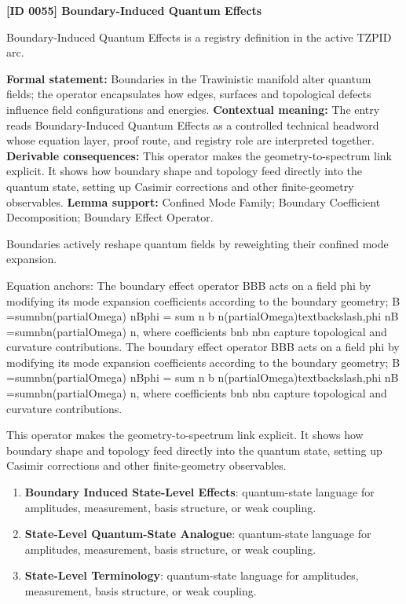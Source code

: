 \clearpage
\noindent\textbf{[ID 0055] Boundary-Induced Quantum Effects}\par
\vspace{0.35em}
\begingroup\small
{}
Boundary-Induced Quantum Effects is a registry definition in the active TZPID arc.

\begingroup\footnotesize\setlength{\emergencystretch}{3em}\sloppy
\textbf{Formal statement:} Boundaries in the Trawinistic manifold alter quantum fields; the operator encapsulates how edges, surfaces and topological defects influence field configurations and energies. \textbf{Contextual meaning:} The entry reads Boundary-Induced Quantum Effects as a controlled technical headword whose equation layer, proof route, and registry role are interpreted together. \textbf{Derivable consequences:} This operator makes the geometry-to-spectrum link explicit. It shows how boundary shape and topology feed directly into the quantum state, setting up Casimir corrections and other finite-geometry observables. \textbf{Lemma support:} Confined Mode Family; Boundary Coefficient Decomposition; Boundary Effect Operator.\par
\endgroup

Boundaries actively reshape quantum fields by reweighting their confined mode expansion.

Equation anchors: The boundary effect operator BBB acts on a field  phi  by modifying its mode expansion coefficients according to the boundary geometry; B =sumnbn(partialOmega)  nBphi = sum n b n(partialOmega)textbackslash,phi nB =sumnbn(partialOmega) n, where coefficients bnb nbn capture topological and curvature contributions. The boundary effect operator BBB acts on a field  phi  by modifying its mode expansion coefficients according to the boundary geometry; B =sumnbn(partialOmega)  nBphi = sum n b n(partialOmega)textbackslash,phi nB =sumnbn(partialOmega) n, where coefficients bnb nbn capture topological and curvature contributions.

This operator makes the geometry-to-spectrum link explicit. It shows how boundary shape and topology feed directly into the quantum state, setting up Casimir corrections and other finite-geometry observables.
\endgroup

\begingroup\footnotesize\sloppy
\begin{enumerate}[leftmargin=1.35em,itemsep=1pt,topsep=1pt,parsep=0pt]
\item \textbf{Boundary Induced State-Level Effects}: quantum-state language for amplitudes, measurement, basis structure, or weak coupling.
\item \textbf{State-Level Quantum-State Analogue}: quantum-state language for amplitudes, measurement, basis structure, or weak coupling.
\item \textbf{State-Level Terminology}: quantum-state language for amplitudes, measurement, basis structure, or weak coupling.
\end{enumerate}
\endgroup

